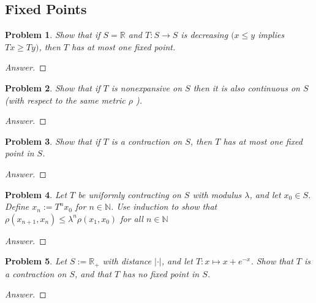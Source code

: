 \documentclass{article}
\newtheorem{problem}{Problem}
\begin{document}
\subsection{Fixed Points}
\begin{problem} Show that if $S=\mathbb{R}$ and $T: S \rightarrow S$ is decreasing $(x \leq y$ implies $T x \geq T y)$, then $T$ has at most one fixed point.
\end{problem}
\begin{proof}[Answer]
    
\end{proof}
\begin{problem} Show that if $T$ is nonexpansive on $S$ then it is also continuous on $S$ (with respect to the same metric $\rho$ ).
\end{problem}
\begin{proof}[Answer]
    
\end{proof}
\begin{problem} Show that if $T$ is a contraction on $S$, then $T$ has at most one fixed point in $S$.
\end{problem}
\begin{proof}[Answer]
    
\end{proof}
\begin{problem} Let $T$ be uniformly contracting on $S$ with modulus $\lambda$, and let $x_{0} \in S$. Define $x_{n}:=T^{n} x_{0}$ for $n \in \mathbb{N}$. Use induction to show that $\rho\left(x_{n+1}, x_{n}\right) \leq \lambda^{n} \rho\left(x_{1}, x_{0}\right)$
for all $n \in \mathbb{N}$
\end{problem}
\begin{proof}[Answer]
    
\end{proof}
\begin{problem} Let $S:=\mathbb{R}_{+}$ with distance $|\cdot|$, and let $T: x \mapsto x+e^{-x}$. Show that $T$ is a contraction on $S$, and that $T$ has no fixed point in $S$.
\end{problem}
\begin{proof}[Answer]
    
\end{proof}
\end{document}
